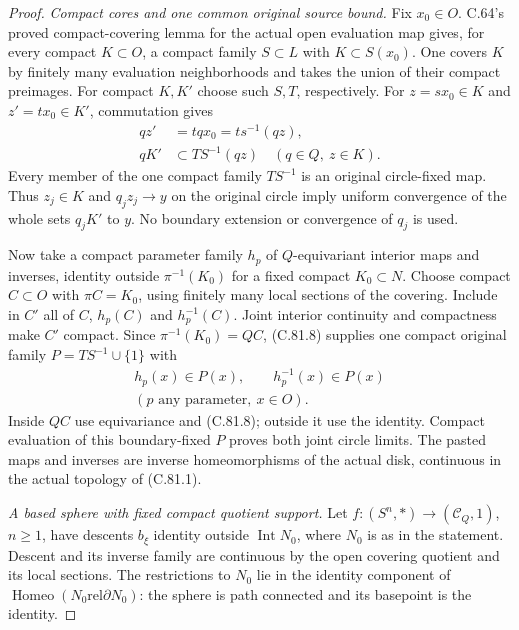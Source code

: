 \begin{proof}
\emph{Compact cores and one common original source bound.}
Fix $x_0\in O$. C.64's proved compact-covering
lemma for the actual open evaluation map
gives, for every compact $K\subset O$, a
compact family $S\subset L$ with $K\subset S(x_0)$.
One covers $K$ by finitely many evaluation
neighborhoods and takes the union of their
compact preimages. For compact $K,K'$ choose
such $S,T$, respectively. For $z=sx_0\in K$
and $z'=tx_0\in K'$, commutation gives
\[
 \begin{split}
       qz'&=tqx_0=ts^{-1}(qz),\\
       qK'&\subset TS^{-1}(qz)\quad(q\in Q,\ z\in K).
 \end{split}
                                                               \tag{C.81.8}
\]
Every member of the one compact family
$TS^{-1}$ is an original circle-fixed map.
Thus $z_j\in K$ and $q_jz_j\to y$ on the
original circle imply uniform convergence
of the whole sets $q_jK'$ to $y$. No boundary
extension or convergence of $q_j$ is used.

Now take a compact parameter family $h_p$ of
$Q$-equivariant interior maps and inverses,
identity outside $\pi^{-1}(K_0)$ for a fixed
compact $K_0\subset N$. Choose compact
$C\subset O$ with $\pi C=K_0$, using finitely
many local sections of the covering. Include
in $C'$ all of $C$, $h_p(C)$ and $h_p^{-1}(C)$.
Joint interior continuity and compactness make
$C'$ compact. Since $\pi^{-1}(K_0)=QC$,
(C.81.8) supplies one compact original
family $P=TS^{-1}\cup\{1\}$ with
\[
 \begin{gathered}
                h_p(x)\in P(x),\qquad h_p^{-1}(x)\in P(x)\\
                       (p\text{ any parameter},\ x\in O).
 \end{gathered}
                                                               \tag{C.81.9}
\]
Inside $QC$ use equivariance and (C.81.8);
outside it use the identity. Compact evaluation
of this boundary-fixed $P$ proves both joint
circle limits. The pasted maps and inverses
are inverse homeomorphisms of the actual disk,
continuous in the actual topology of (C.81.1).

\emph{A based sphere with fixed compact quotient support.}
Let $f:(S^n,*)\to(\mathscr C_Q,1)$, $n\geq1$,
have descents $b_\xi$ identity outside
$\operatorname{Int}N_0$, where $N_0$ is as
in the statement. Descent and its inverse
family are continuous by the open covering
quotient and its local sections. The restrictions
to $N_0$ lie in the identity component of
$\operatorname{Homeo}(N_0\mathrel{\mathrm{rel}}\partial N_0)$:
the sphere is path connected and its basepoint
is the identity.


\end{proof}
